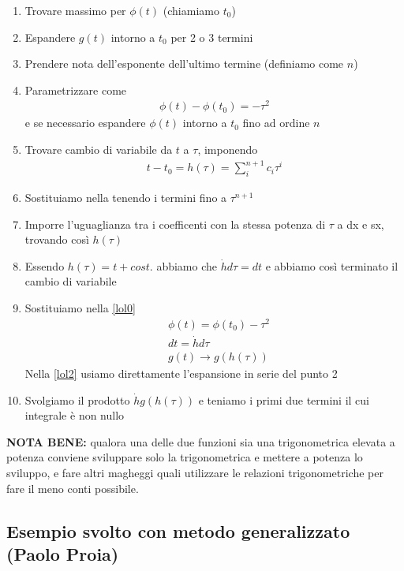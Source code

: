 \begin{enumerate}
	\item Trovare massimo per \(\phi(t)\) (chiamiamo \(t_0\))
	\item Espandere \(g(t)\) intorno a \(t_0\) per 2 o 3 termini
	\item Prendere nota dell'esponente dell'ultimo termine (definiamo come  \(n\)) 
	\item Parametrizzare come 
	\begin{align}
		\phi(t) - \phi(t_0)=-\tau^2 \label{lol1}
	\end{align}
	e se necessario espandere \(\phi(t)\) intorno a $t_0$ fino ad ordine \(n\)
	\item Trovare cambio di variabile da \(t\) a \(\tau\), imponendo
	\begin{align}
		t - t_0 = h(\tau) = \sum_i^{n+1} c_i \tau^i
	\end{align}
	\item Sostituiamo nella  tenendo i termini fino a \(\tau^{n+1}\)
	\item Imporre l'uguaglianza tra i coefficenti con la stessa potenza di \(\tau\) a dx e sx, trovando così \(h(\tau)\)
	\item Essendo \(h(\tau) = t + cost. \) abbiamo che \(\dot{h}d\tau = dt\) e abbiamo così terminato il cambio di variabile
	\item Sostituiamo nella \ref{lol0}
	\begin{align}
		&\phi(t) = \phi(t_0) - \tau^2\\
		&dt=\dot{h}d\tau\\
		&g(t) \to g(h(\tau)) \label{lol2}
	\end{align}
	Nella \ref{lol2} usiamo direttamente l'espansione in serie del punto 2
	\item Svolgiamo il prodotto \(\dot{h}g(h(\tau))\) e teniamo i primi due termini il cui integrale è non nullo
\end{enumerate}

\textbf{NOTA BENE:} qualora una delle due funzioni sia una trigonometrica elevata a potenza conviene sviluppare solo la trigonometrica e mettere a potenza lo sviluppo, e fare altri magheggi
quali utilizzare le relazioni trigonometriche per fare il meno conti possibile.
\newpage

\subsection{Esempio svolto con metodo generalizzato (Paolo Proia)}

